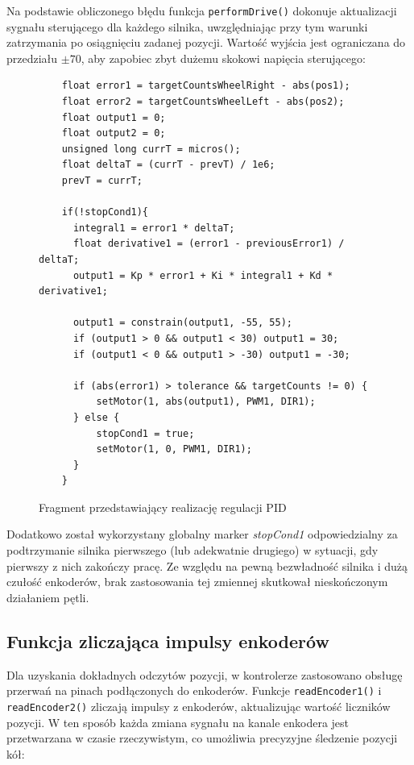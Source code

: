 Na podstawie obliczonego błędu funkcja \texttt{performDrive()} dokonuje aktualizacji sygnału sterującego dla każdego silnika, uwzględniając przy tym warunki zatrzymania po osiągnięciu zadanej pozycji. Wartość wyjścia jest ograniczana do przedziału \( \pm 70 \), aby zapobiec zbyt dużemu skokowi napięcia sterującego:

\begin{figure}[h!]
  \centering
  \begin{lstlisting}
    float error1 = targetCountsWheelRight - abs(pos1);
    float error2 = targetCountsWheelLeft - abs(pos2);
    float output1 = 0;
    float output2 = 0;
    unsigned long currT = micros();
    float deltaT = (currT - prevT) / 1e6;
    prevT = currT;

    if(!stopCond1){
      integral1 = error1 * deltaT;
      float derivative1 = (error1 - previousError1) / deltaT;
      output1 = Kp * error1 + Ki * integral1 + Kd * derivative1;

      output1 = constrain(output1, -55, 55);
      if (output1 > 0 && output1 < 30) output1 = 30;
      if (output1 < 0 && output1 > -30) output1 = -30;

      if (abs(error1) > tolerance && targetCounts != 0) {
          setMotor(1, abs(output1), PWM1, DIR1);
      } else {
          stopCond1 = true;
          setMotor(1, 0, PWM1, DIR1);
      }
    }
  \end{lstlisting}
  \caption{Fragment przedstawiający realizację regulacji PID}
  \label{fig:pseudokod:pid}
\end{figure}

Dodatkowo został wykorzystany globalny marker \textit{stopCond1} odpowiedzialny za podtrzymanie silnika pierwszego (lub adekwatnie drugiego) w sytuacji, gdy pierwszy z nich zakończy pracę. Ze względu na pewną bezwładność silnika i dużą czułość enkoderów, brak zastosowania tej zmiennej skutkował nieskończonym działaniem pętli. 

\subsection{Funkcja zliczająca impulsy enkoderów}

Dla uzyskania dokładnych odczytów pozycji, w kontrolerze zastosowano obsługę przerwań na pinach podłączonych do enkoderów. Funkcje \texttt{readEncoder1()} i \texttt{readEncoder2()} zliczają impulsy z enkoderów, aktualizując wartość liczników pozycji. W ten sposób każda zmiana sygnału na kanale enkodera jest przetwarzana w czasie rzeczywistym, co umożliwia precyzyjne śledzenie pozycji kół:

